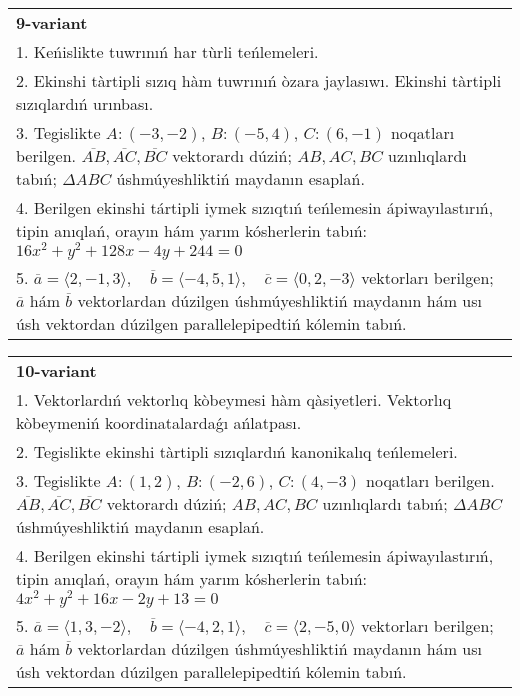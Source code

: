 \documentclass{article}
\begin{document}
\begin{tabular}{m{17cm}}
\textbf{9-variant}\\
1. Keńislikte tuwrınıń har tùrli teńlemeleri. \\

2. Ekinshi tàrtipli sızıq hàm tuwrınıń òzara jaylasıwı. Ekinshi tàrtipli sızıqlardıń urınbası.\\

3. Tegislikte $A: (-3, -2)$, $B: (-5, 4)$, $C: (6, -1)$ noqatları berilgen. $\overline{AB}, \overline{AC}, \overline{BC}$ vektorardı dúziń; $AB, AC, BC$ uzınlıqlardı tabıń; $\Delta ABC$ úshmúyeshliktiń maydanın esaplań. \\

4. Berilgen ekinshi tártipli iymek sızıqtıń teńlemesin ápiwayılastırıń, tipin anıqlań, orayın hám yarım kósherlerin tabıń: $16x^2+y^2+128x-4y+244=0$\\

5. \(\overline{a} = \langle 2, -1, 3 \rangle, \quad \overline{b} = \langle -4, 5, 1 \rangle, \quad \overline{c} = \langle 0, 2, -3 \rangle\) vektorları berilgen; \(\overline{a}\) hám \(\overline{b}\) vektorlardan dúzilgen úshmúyeshliktiń maydanın hám usı úsh vektordan dúzilgen parallelepipedtiń kólemin tabıń.
\end{tabular}
\vspace{1cm}


\begin{tabular}{m{17cm}}
\textbf{10-variant}\\
1. Vektorlardıń vektorlıq kòbeymesi hàm qàsiyetleri. Vektorlıq kòbeymeniń koordinatalardaǵı ańlatpası. \\

2. Tegislikte ekinshi tàrtipli sızıqlardıń kanonikalıq teńlemeleri.\\

3. Tegislikte $A: (1, 2)$, $B: (-2, 6)$, $C: (4, -3)$ noqatları berilgen. $\overline{AB}, \overline{AC}, \overline{BC}$ vektorardı dúziń; $AB, AC, BC$ uzınlıqlardı tabıń; $\Delta ABC$ úshmúyeshliktiń maydanın esaplań. \\

4. Berilgen ekinshi tártipli iymek sızıqtıń teńlemesin ápiwayılastırıń, tipin anıqlań, orayın hám yarım kósherlerin tabıń: $4x^2+y^2+16x-2y+13=0$\\

5. \(\overline{a} = \langle 1, 3, -2 \rangle, \quad \overline{b} = \langle -4, 2, 1 \rangle, \quad \overline{c} = \langle 2, -5, 0 \rangle\) vektorları berilgen; \(\overline{a}\) hám \(\overline{b}\) vektorlardan dúzilgen úshmúyeshliktiń maydanın hám usı úsh vektordan dúzilgen parallelepipedtiń kólemin tabıń.
\end{tabular}
\vspace{1cm}
\end{document}

